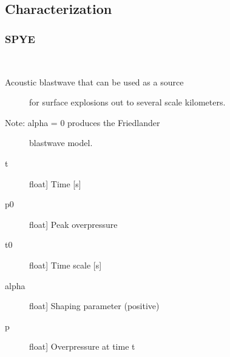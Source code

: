 \documentclass[letterpaper,10pt,english]{sphinxmanual}
\begin{document}
\subsection{Characterization}
\label{\detokenize{infrapy.characterization:characterization}}\label{\detokenize{infrapy.characterization::doc}}

\subsubsection{SPYE}
\label{\detokenize{infrapy.characterization:module-infrapy.characterization.spye}}\label{\detokenize{infrapy.characterization:spye}}

\begin{fulllineitems}
\label{\detokenize{infrapy.characterization:infrapy.characterization.spye.blastwave}}~\begin{description}
\item[{Acoustic blastwave that can be used as a source}] \leavevmode
for surface explosions out to several scale
kilometers.

\item[{Note: alpha = 0 produces the Friedlander}] \leavevmode
blastwave model.

\end{description}
\begin{description}
\item[{t}] \leavevmode{[}float{]}
Time {[}s{]}

\item[{p0}] \leavevmode{[}float{]}
Peak overpressure

\item[{t0}] \leavevmode{[}float{]}
Time scale {[}s{]}

\item[{alpha}] \leavevmode{[}float{]}
Shaping parameter (positive)

\end{description}
\begin{description}
\item[{p}] \leavevmode{[}float{]}
Overpressure at time t

\end{description}

\end{fulllineitems}
\end{document}
